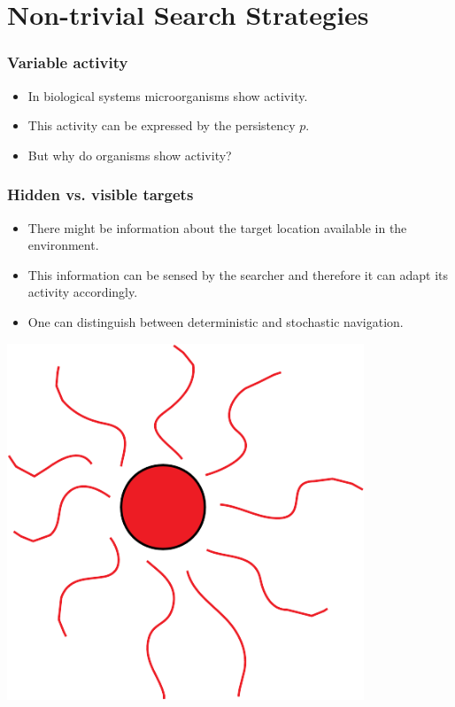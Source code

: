 \documentclass[11pt]{beamer}
\begin{document}
\section{Non-trivial Search Strategies}

\begin{frame}
 \frametitle{Variable activity}
 
 \begin{itemize}
  \item In biological systems microorganisms show activity.
  \item This activity can be expressed by the persistency $p$.
  \item But why do organisms show activity?
 \end{itemize}

\end{frame}


\begin{frame}
 \frametitle{Hidden vs. visible targets}
 
 \begin{minipage}[h]{0.59\textwidth}
  \begin{itemize}
  \item There might be information about the target location available in the environment.
  \item This information can be sensed by the searcher and therefore it can adapt its activity accordingly.
  \item One can distinguish between deterministic and stochastic navigation.
 \end{itemize}
 \end{minipage}
 \begin{minipage}[h]{0.4\textwidth}
  \centering
  \includegraphics[width=0.8\textwidth]{gfx/smell.png}
 \end{minipage}

\end{frame}
\end{document}
